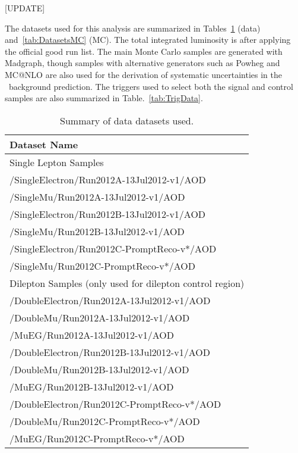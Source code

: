 
[UPDATE]

The datasets used for this analysis are summarized in 
Tables~\ref{tab:DatasetsData} (data) and~\ref{tab:DatasetsMC} (MC).
The total integrated luminosity is \lumi after
applying the official good run list. The main Monte Carlo
samples are generated with Madgraph, though samples with
alternative generators such as Powheg and MC@NLO are also used for
the derivation of systematic uncertainties in the \ttbar~background prediction. 
The triggers used to select both the signal and control samples are
also summarized in Table.~\ref{tab:TrigData}.


\begin{table}[!ht]
\begin{center}
\begin{tabular}{l}
\hline
Dataset Name   \\
\hline
\hline
Single Lepton Samples \\
\hline
  /SingleElectron/Run2012A-13Jul2012-v1/AOD   \\
  /SingleMu/Run2012A-13Jul2012-v1/AOD   \\
  /SingleElectron/Run2012B-13Jul2012-v1/AOD   \\
  /SingleMu/Run2012B-13Jul2012-v1/AOD   \\
  /SingleElectron/Run2012C-PromptReco-v*/AOD   \\         
  /SingleMu/Run2012C-PromptReco-v*/AOD   \\         
\hline
\hline
Dilepton Samples (only used for dilepton control region)\\
\hline
  /DoubleElectron/Run2012A-13Jul2012-v1/AOD   \\
  /DoubleMu/Run2012A-13Jul2012-v1/AOD   \\
  /MuEG/Run2012A-13Jul2012-v1/AOD   \\
  /DoubleElectron/Run2012B-13Jul2012-v1/AOD   \\
  /DoubleMu/Run2012B-13Jul2012-v1/AOD   \\
  /MuEG/Run2012B-13Jul2012-v1/AOD   \\
  /DoubleElectron/Run2012C-PromptReco-v*/AOD   \\         
  /DoubleMu/Run2012C-PromptReco-v*/AOD   \\         
  /MuEG/Run2012C-PromptReco-v*/AOD   \\         
\hline
\end{tabular}
\caption{Summary of data datasets used.\label{tab:DatasetsData}}
\end{center}
\end{table}

